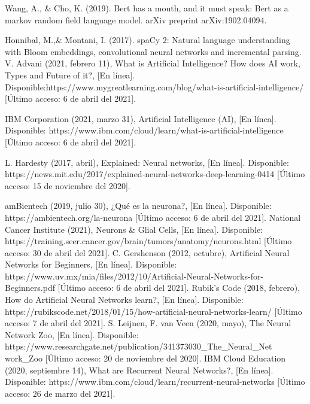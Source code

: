\documentclass[12pt, a4paper, titlepage]{report}
\begin{document}
\begin{thebibliography}{20}
	Wang, A., \& Cho, K. (2019). Bert has a mouth, and it must speak: Bert as a markov random field language model. arXiv preprint arXiv:1902.04094.
	
	Honnibal, M.,\& Montani, I. (2017). spaCy 2: Natural language understanding with Bloom embeddings, convolutional neural networks and incremental parsing.
	V. Advani (2021, febrero 11), What is Artificial Intelligence? How does AI work, Types and Future of it?, [En línea]. Disponible:https://www.mygreatlearning.com/blog/what-is-artificial-intelligence/ [Último acceso: 6 de abril del 2021].
	
	IBM Corporation (2021, marzo 31), Artificial Intelligence (AI), [En línea]. Disponible: https://www.ibm.com/cloud/learn/what-is-artificial-intelligence [Último acceso: 6 de abril del 2021].
	
	L. Hardesty (2017, abril), Explained: Neural networks, [En línea]. Disponible: https://news.mit.edu/2017/explained-neural-networks-deep-learning-0414 [Último acceso: 15 de noviembre del 2020].	
	
	amBientech (2019, julio 30), ¿Qué es la neurona?, [En línea]. Disponible: https://ambientech.org/la-neurona [Último acceso: 6 de abril del 2021].
	National Cancer Institute (2021), Neurons \& Glial Cells, [En línea]. Disponible: https://training.seer.cancer.gov/brain/tumors/anatomy/neurons.html [Último acceso: 30 de abril del 2021].	
	C. Gershenson (2012, octubre), Artificial Neural Networks for Beginners, [En línea]. Disponible: https://www.uv.mx/mia/files/2012/10/Artificial-Neural-Networks-for-Beginners.pdf [Último acceso: 6 de abril del 2021].
	Rubik's Code (2018, febrero), How do Artificial Neural Networks learn?, [En línea]. Disponible: https://rubikscode.net/2018/01/15/how-artificial-neural-networks-learn/ [Último acceso: 7 de abril del 2021].	
	S. Leijnen, F. van Veen (2020, mayo), The Neural Network Zoo, [En línea]. Disponible: https://www.researchgate.net/publication/341373030\_The\_Neural\_Net\\work\_Zoo [Último acceso: 20 de noviembre del 2020].
	IBM Cloud Education (2020, septiembre 14), What are Recurrent Neural Networks?, [En línea]. Disponible: https://www.ibm.com/cloud/learn/recurrent-neural-networks [Último acceso: 26 de marzo del 2021].
	

\end{thebibliography}
\end{document}
